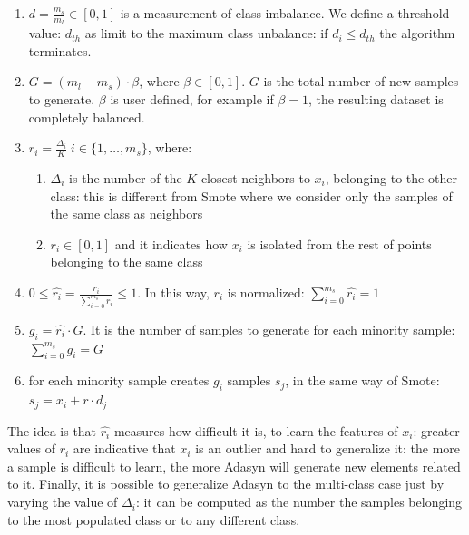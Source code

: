 \documentclass[LaM,binding=0.6cm]{sapthesis}
\begin{document}
\begin{enumerate}
\item $d = \frac{m_s}{m_l} \in [0,1]$ is a measurement of class imbalance. We define a threshold value: $d_{th}$ as limit to the maximum class unbalance: if $d_i\le d_{th}$ the algorithm terminates.
\item $G=(m_l - m_s)\cdot \beta$, where $\beta \in [0,1]$. $G$ is the total number of new samples to generate. $\beta$ is user defined, for example if $\beta=1$, the resulting dataset is completely balanced.
\item $r_i = \frac{\Delta_i}{K} \; i \in \{1,\dots,m_{s}\}$, where:
\begin{enumerate}
\item  $\Delta_i$ is the number of the $K$ closest neighbors to $x_i$, belonging to the other class: this is different from Smote where we consider only the samples of the same class as neighbors
\item $r_i \in [0,1]$ and it indicates how $x_i$ is isolated from the rest of points belonging to the same class
\end{enumerate}
\item $0\leq \hat{r_i}=\frac{r_i}{\sum_{i=0}^{m_s}r_i }\leq 1$. In this way, $r_i$ is normalized: $\sum_{i=0}^{m_s}\hat{r_i} =1$
\item $g_i=\hat{r_i}\cdot G$. It is the number of samples to generate for each minority sample: $\sum_{i=0}^{m_s}g_i =G$ 
\item for each minority sample creates $g_i$ samples $s_j$, in the same way of Smote: $s_j = x_i+r\cdot d_j$
\end{enumerate}
The idea is that $\hat{r_i}$ measures how difficult it is, to learn the features of $x_i$: greater values of $r_i$ are indicative that $x_i$ is an outlier and hard to generalize it: the more a sample is difficult to learn, the more Adasyn will generate new elements related to it. Finally, it is possible to generalize Adasyn to the multi-class case just by varying the value of $\Delta_i$: it can be computed as the number the samples belonging to the most populated class or to any different class.
\end{document}
